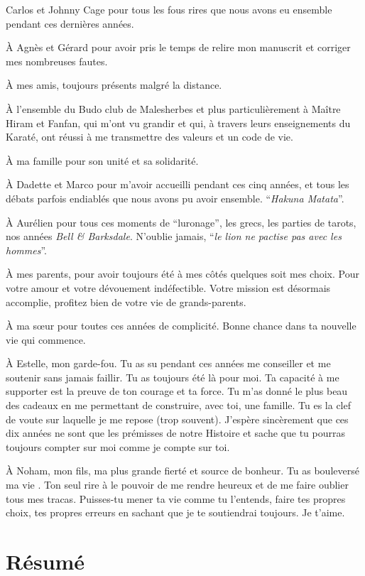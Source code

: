 \documentclass[12pt,a4paper,twoside]{ugathesis}
\begin{document}
Carlos et Johnny Cage pour tous les fous rires que nous avons eu
ensemble pendant ces dernières années.

À Agnès et Gérard pour avoir pris le temps de relire mon manuscrit et
corriger mes nombreuses fautes.

À mes amis, toujours présents malgré la distance.

À l'ensemble du Budo club de Malesherbes et plus particulièrement à
Maître Hiram et Fanfan, qui m'ont vu grandir et qui, à travers leurs
enseignements du Karaté, ont réussi à me transmettre des valeurs et un
code de vie.

À ma famille pour son unité et sa solidarité.

À Dadette et Marco pour m'avoir accueilli pendant ces cinq années, et
tous les débats parfois endiablés que nous avons pu avoir ensemble.
``\emph{Hakuna Matata}''.

À Aurélien pour tous ces moments de ``luronage'', les grecs, les parties
de tarots, nos années \emph{Bell \& Barksdale}. N'oublie jamais,
``\emph{le lion ne pactise pas avec les hommes}''.

À mes parents, pour avoir toujours été à mes côtés quelques soit mes
choix. Pour votre amour et votre dévouement indéfectible. Votre mission
est désormais accomplie, profitez bien de votre vie de grands-parents.

À ma sœur pour toutes ces années de complicité. Bonne chance dans ta
nouvelle vie qui commence.

À Estelle, mon garde-fou. Tu as su pendant ces années me conseiller et
me soutenir sans jamais faillir. Tu as toujours été là pour moi. Ta
capacité à me supporter est la preuve de ton courage et ta force. Tu
m'as donné le plus beau des cadeaux en me permettant de construire, avec
toi, une famille. Tu es la clef de voute sur laquelle je me repose (trop
souvent). J'espère sincèrement que ces dix années ne sont que les
prémisses de notre Histoire et sache que tu pourras toujours compter sur
moi comme je compte sur toi.

À Noham, mon fils, ma plus grande fierté et source de bonheur. Tu as
bouleversé ma vie . Ton seul rire à le pouvoir de me rendre heureux et
de me faire oublier tous mes tracas. Puisses-tu mener ta vie comme tu
l'entends, faire tes propres choix, tes propres erreurs en sachant que
je te soutiendrai toujours. Je t'aime.

\chapter*{Résumé}\label{resume}
\end{document}
